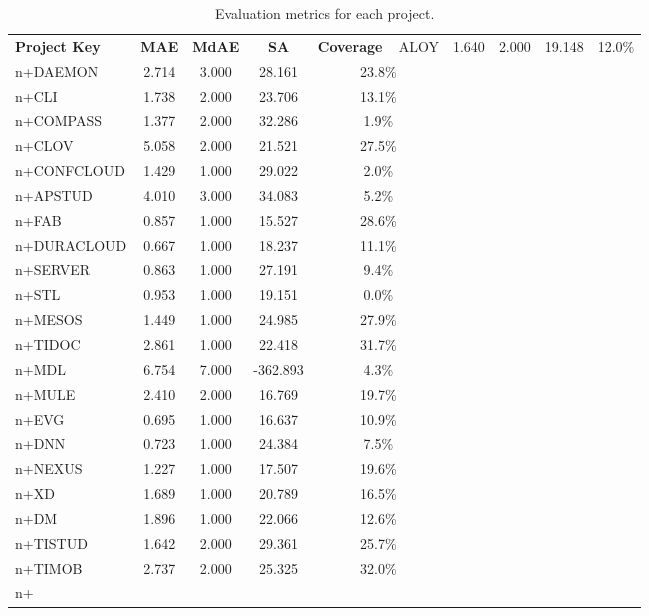 \begin{table}[h!]
    \centering
    \begin{tabular}{|l|c|c|c|c|}
    \hline
    \textbf{Project Key} & \textbf{MAE} & \textbf{MdAE} & \textbf{SA} & \textbf{Coverage} \    \hline
    ALOY & 1.640 & 2.000 & 19.148 & 12.0\% \\n+DAEMON & 2.714 & 3.000 & 28.161 & 23.8\% \\n+CLI & 1.738 & 2.000 & 23.706 & 13.1\% \\n+COMPASS & 1.377 & 2.000 & 32.286 & 1.9\% \\n+CLOV & 5.058 & 2.000 & 21.521 & 27.5\% \\n+CONFCLOUD & 1.429 & 1.000 & 29.022 & 2.0\% \\n+APSTUD & 4.010 & 3.000 & 34.083 & 5.2\% \\n+FAB & 0.857 & 1.000 & 15.527 & 28.6\% \\n+DURACLOUD & 0.667 & 1.000 & 18.237 & 11.1\% \\n+SERVER & 0.863 & 1.000 & 27.191 & 9.4\% \\n+STL & 0.953 & 1.000 & 19.151 & 0.0\% \\n+MESOS & 1.449 & 1.000 & 24.985 & 27.9\% \\n+TIDOC & 2.861 & 1.000 & 22.418 & 31.7\% \\n+MDL & 6.754 & 7.000 & -362.893 & 4.3\% \\n+MULE & 2.410 & 2.000 & 16.769 & 19.7\% \\n+EVG & 0.695 & 1.000 & 16.637 & 10.9\% \\n+DNN & 0.723 & 1.000 & 24.384 & 7.5\% \\n+NEXUS & 1.227 & 1.000 & 17.507 & 19.6\% \\n+XD & 1.689 & 1.000 & 20.789 & 16.5\% \\n+DM & 1.896 & 1.000 & 22.066 & 12.6\% \\n+TISTUD & 1.642 & 2.000 & 29.361 & 25.7\% \\n+TIMOB & 2.737 & 2.000 & 25.325 & 32.0\% \\n+\hline
  \end{tabular}
  \caption{Evaluation metrics for each project.}
  \label{tab:project_metrics}
  \end{table}